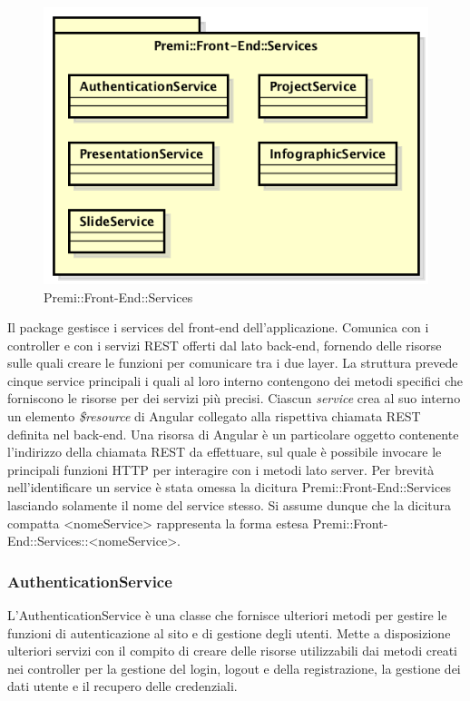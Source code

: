 \begin{figure}[h]
	\centering
	\includegraphics[width=0.7\linewidth]{img/premi_front_end_services}
	\caption[Premi::Front-End::Services]{Premi::Front-End::Services}
\end{figure}
Il package gestisce i services del \gls{front-end} dell'applicazione. Comunica con i controller e con i servizi \gls{REST} offerti dal lato \gls{back-end}, fornendo delle risorse sulle quali creare le funzioni per comunicare tra i due layer. La struttura prevede cinque service principali i quali al loro interno contengono dei metodi specifici che forniscono le risorse per dei servizi più precisi.
Ciascun \textit{service} crea al suo interno un elemento \textit{\$resource} di \gls{Angular} collegato alla rispettiva chiamata REST definita nel back-end. Una risorsa di Angular è un particolare oggetto contenente l'indirizzo della chiamata REST da effettuare, sul quale è possibile invocare le principali funzioni HTTP per interagire con i metodi lato server.
Per brevità nell'identificare un service è stata omessa la dicitura Premi::\gls{Front-End}::Services lasciando solamente il nome del service stesso. Si assume dunque che la dicitura compatta <nomeService> rappresenta la forma estesa Premi::\gls{Front-End}::Services::<nomeService>.
\newpage


\subsubsection{AuthenticationService}
L'AuthenticationService è una classe che fornisce ulteriori metodi per gestire le funzioni di autenticazione al sito e di gestione degli utenti. Mette a disposizione ulteriori servizi con il compito di creare delle risorse utilizzabili dai metodi creati nei controller per la gestione del login, logout e della registrazione, la gestione dei dati utente e il recupero delle credenziali.

